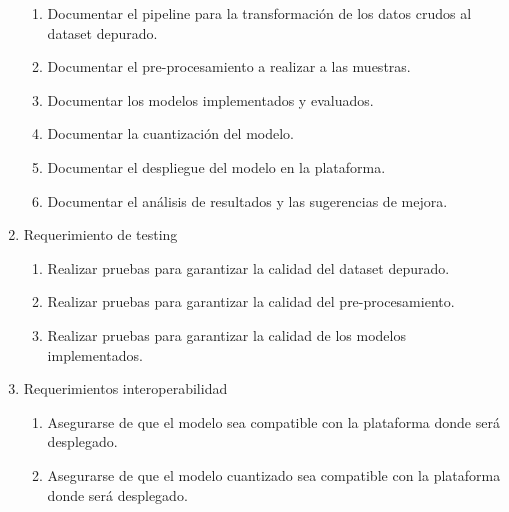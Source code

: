 \documentclass[
11pt, %
codirector, %
]{charter}
\begin{document}
\begin{enumerate}
\begin{enumerate}
			\item Documentar el pipeline para la transformación de los datos crudos al dataset depurado.
			\item Documentar el pre-procesamiento a realizar a las muestras.
			\item Documentar los modelos implementados y evaluados.
			\item Documentar la cuantización del modelo.
			\item Documentar el despliegue del modelo en la plataforma.
			\item Documentar el análisis de resultados y las sugerencias de mejora.
		\end{enumerate}
	\item Requerimiento de testing
		\begin{enumerate}
			\item Realizar pruebas para garantizar la calidad del dataset depurado. 
			\item Realizar pruebas para garantizar la calidad del pre-procesamiento. 
			\item Realizar pruebas para garantizar la calidad de los modelos implementados.
		\end{enumerate}
	\item Requerimientos interoperabilidad
			\begin{enumerate}
			\item Asegurarse de que el modelo sea compatible con la plataforma donde será desplegado.
			\item Asegurarse de que el modelo cuantizado sea compatible con la plataforma donde será desplegado.
		\end{enumerate}
\end{enumerate}
\end{document}
